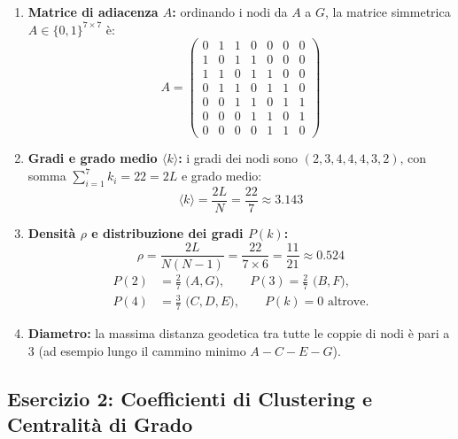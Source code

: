 \begin{enumerate}
    \item \textbf{Matrice di adiacenza $A$:} ordinando i nodi da $A$ a $G$, la matrice simmetrica $A \in \{0,1\}^{7 \times 7}$ \`e:
    \begin{equation*}
        A = \begin{pmatrix}
        0 & 1 & 1 & 0 & 0 & 0 & 0 \\
        1 & 0 & 1 & 1 & 0 & 0 & 0 \\
        1 & 1 & 0 & 1 & 1 & 0 & 0 \\
        0 & 1 & 1 & 0 & 1 & 1 & 0 \\
        0 & 0 & 1 & 1 & 0 & 1 & 1 \\
        0 & 0 & 0 & 1 & 1 & 0 & 1 \\
        0 & 0 & 0 & 0 & 1 & 1 & 0
        \end{pmatrix}
    \end{equation*}
    \item \textbf{Gradi e grado medio $\langle k \rangle$:} i gradi dei nodi sono $(2, 3, 4, 4, 4, 3, 2)$, con somma $\sum_{i=1}^7 k_i = 22 = 2L$ e grado medio:
    \begin{equation*}
        \langle k \rangle = \frac{2L}{N} = \frac{22}{7} \approx 3.143
    \end{equation*}
    \item \textbf{Densit\`a $\rho$ e distribuzione dei gradi $P(k)$:}
    \begin{equation*}
        \rho = \frac{2L}{N(N-1)} = \frac{22}{7 \times 6} = \frac{11}{21} \approx 0.524
    \end{equation*}
    \begin{align*}
        P(2) &= \frac{2}{7} \text{ ($A,G$)}, \qquad P(3) = \frac{2}{7} \text{ ($B,F$)}, \\
        P(4) &= \frac{3}{7} \text{ ($C,D,E$)}, \qquad P(k) = 0 \text{ altrove.}
    \end{align*}
    \item \textbf{Diametro:} la massima distanza geodetica tra tutte le coppie di nodi \`e pari a \textbf{$3$} (ad esempio lungo il cammino minimo $A - C - E - G$).
\end{enumerate}

\FloatBarrier
\subsection{Esercizio 2: Coefficienti di Clustering e Centralit\`a di Grado}
\label{sec:dm-ex-ns-clustering}

